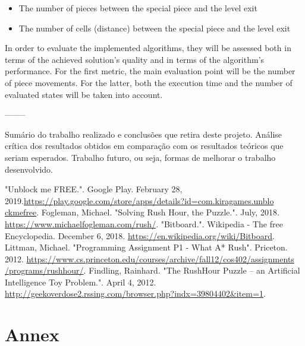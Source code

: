 \documentclass[conference]{IEEEtran}
\begin{document}
\begin{itemize}
    \item The number of pieces between the special piece and the level exit
    \item The number of cells (distance) between the special piece and the level exit
\end{itemize}

In order to evaluate the implemented algorithms, they will be assessed both in terms of the achieved solution's quality and in terms of the algorithm's performance. For the first metric, the main evaluation point will be the number of piece movements. For the latter, both the execution time and the number of evaluated states will be taken into account.

--------

Sumário do trabalho realizado e conclusões que retira deste projeto. Análise crítica dos resultados obtidos em comparação com os resultados teóricos que seriam esperados. Trabalho futuro, ou seja, formas de melhorar o trabalho desenvolvido.

\begin{thebibliography}{00}
    
 "Unblock me FREE.". Google Play. February 28, 2019.\href{https://play.google.com/store/apps/details?id=com.kiragames.unblockmefree}{https://play.google.com/store/apps/details?id=com.kiragames.unblo\\ckmefree}.
 Fogleman, Michael. "Solving Rush Hour, the Puzzle.". July, 2018. \href{https://www.michaelfogleman.com/rush/}{https://www.michaelfogleman.com/rush/}.
 "Bitboard.". Wikipedia - The free Encyclopedia. December 6, 2018. \href{https://en.wikipedia.org/wiki/Bitboard}{https://en.wikipedia.org/wiki/Bitboard}.
 Littman, Michael. "Programming Assignment P1 - What A* Rush". Priceton. 2012. \href{https://www.cs.princeton.edu/courses/archive/fall12/cos402/assignments/programs/rushhour/}{https://www.cs.princeton.edu/courses/archive/fall12/cos402/assignments\\/programs/rushhour/}.
 Findling, Rainhard. "The RushHour Puzzle – an Artificial Intelligence Toy Problem.". April 4, 2012. \href{http://geekoverdose2.rssing.com/browser.php?indx=39804402\&item=1}{http://geekoverdose2.rssing.com/browser.php?indx=39804402\&item=1}.
\end{thebibliography}

\newpage

\section{Annex} \label{sec:annex}
\end{document}
